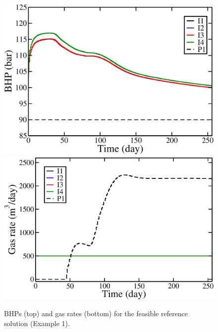 \documentclass[twocolumn,numbook]{svjour3}          %
\begin{document}
\begin{figure}
\begin{center}
\includegraphics[totalheight=2.2in,angle=0]{ReferenceC500HeuristicItPb_BHP.pdf}
\includegraphics[totalheight=2.17in,angle=0]{ReferenceC500HeuristicItPb_rate_gas.pdf}
\end{center}
\caption{BHPs (top) and gas rates (bottom) for the feasible reference solution (Example 1).}
\label{fig:PIReferencePlots}
\end{figure}




\end{document}
